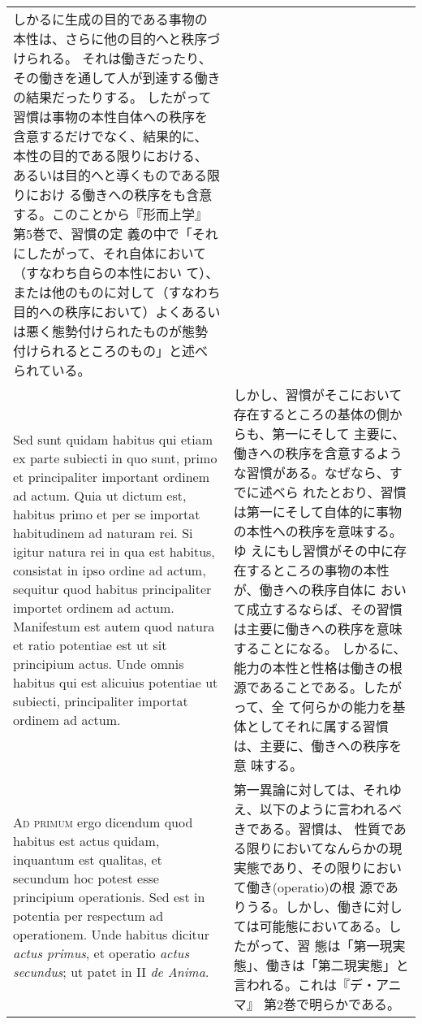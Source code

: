 \documentclass[10pt]{jsarticle} %
\begin{document}
\begin{longtable}{p{21em}p{21em}}
しかるに生成の目的である事物の本性は、さらに他の目的へと秩序づけられる。
それは働きだったり、その働きを通して人が到達する働きの結果だったりする。
したがって習慣は事物の本性自体への秩序を含意するだけでなく、結果的に、
本性の目的である限りにおける、あるいは目的へと導くものである限りにおけ
る働きへの秩序をも含意する。このことから『形而上学』第5巻で、習慣の定
義の中で「それにしたがって、それ自体において（すなわち自らの本性におい
て）、または他のものに対して（すなわち目的への秩序において）よくあるい
は悪く態勢付けられたものが態勢付けられるところのもの」と述べられている。


\\


Sed sunt quidam habitus qui
etiam ex parte subiecti in quo sunt, primo et principaliter important
ordinem ad actum. Quia ut dictum est, habitus primo et per se importat
habitudinem ad naturam rei. Si igitur natura rei in qua est habitus,
consistat in ipso ordine ad actum, sequitur quod habitus principaliter
importet ordinem ad actum. Manifestum est autem quod natura et ratio
potentiae est ut sit principium actus. Unde omnis habitus qui est
alicuius potentiae ut subiecti, principaliter importat ordinem ad
actum.

&

しかし、習慣がそこにおいて存在するところの基体の側からも、第一にそして
主要に、働きへの秩序を含意するような習慣がある。なぜなら、すでに述べら
れたとおり、習慣は第一にそして自体的に事物の本性への秩序を意味する。ゆ
えにもし習慣がその中に存在するところの事物の本性が、働きへの秩序自体に
おいて成立するならば、その習慣は主要に働きへの秩序を意味することになる。
しかるに、能力の本性と性格は働きの根源であることである。したがって、全
て何らかの能力を基体としてそれに属する習慣は、主要に、働きへの秩序を意
味する。

\\



{\scshape Ad primum} ergo dicendum quod habitus est actus quidam, inquantum est
qualitas, et secundum hoc potest esse principium operationis. Sed est
in potentia per respectum ad operationem. Unde habitus dicitur {\itshape actus
primus}, et operatio {\itshape actus secundus}; ut patet in II {\itshape de Anima}.

&

第一異論に対しては、それゆえ、以下のように言われるべきである。習慣は、
性質である限りにおいてなんらかの現実態であり、その限りにおいて働き(operatio)の根
源でありうる。しかし、働きに対しては可能態においてある。したがって、習
態は「第一現実態」、働きは「第二現実態」と言われる。これは『デ・アニマ』
第2巻で明らかである。


\end{longtable}
\end{document}
